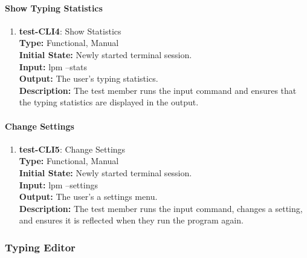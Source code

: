 \documentclass[12pt, titlepage]{article}
\begin{document}
\paragraph{Show Typing Statistics}
\begin{enumerate}

\item{\textbf{test-CLI4}: Show Statistics\\}
\textbf{Type:} Functional, Manual \\
\textbf{Initial State:} Newly started terminal session. \\
\textbf{Input:} lpm --stats \\
\textbf{Output:} The user's typing statistics. \\
\textbf{Description:} The test member runs the input command and ensures that the typing statistics are displayed in the output. \\

\end{enumerate}

\paragraph{Change Settings}
\begin{enumerate}

\item{\textbf{test-CLI5}: Change Settings\\}
\textbf{Type:} Functional, Manual \\
\textbf{Initial State:} Newly started terminal session. \\
\textbf{Input:} lpm --settings \\
\textbf{Output:} The user's a settings menu. \\
\textbf{Description:} The test member runs the input command, changes a setting, and ensures it is reflected when they run the program again. \\

\end{enumerate}

\subsubsection{Typing Editor}
\end{document}
